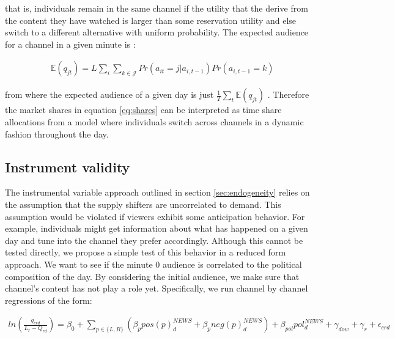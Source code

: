 \documentclass[12pt]{article}
\begin{document}
that is, individuals remain in the same channel if the utility that the derive from the content they have watched is larger than some reservation utility and else switch to a different alternative with uniform probability. The expected audience for a channel in a given minute is :

\begin{equation}\label{}
	\begin{aligned}
		& \mathds{E}(q_{jt})= L \sum_i \sum_{k \in \mathcal{J}}Pr \left(a_{it}= j | a_{i,t-1}\right)Pr \left(a_{i,t-1}=k\right)
	\end{aligned}
\end{equation} 

from where the expected audience of a given day is just $\frac{1}{T}  \sum_t \mathds{E}(q_{jt})$ .  Therefore the market shares in equation \ref{eq:shares} can be interpreted as time share allocations from a model where individuals switch across channels in a dynamic fashion throughout the day. 





\subsection{Instrument validity}


The instrumental variable approach outlined in section \ref{sec:endogeneity} relies on the assumption that the supply shifters are uncorrelated to demand. This assumption would be violated if viewers exhibit some anticipation behavior. For example, individuals might get information about what has happened on a given day and tune into the channel they prefer accordingly. Although this cannot be tested directly, we propose a simple test of this behavior in a reduced form approach. We want to see if the minute 0 audience is correlated to the political composition of the day. By considering the initial audience, we make sure that channel's content has not play a role yet. Specifically, we run channel by channel regressions of the form: 

\begin{equation}\label{eq:check_exogeneity}
	\begin{aligned}
   ln\left( \frac{q_{crd}}{L_{r}-Q_{rd}}  \right) = \beta_0 + \sum_{p \in \{L,R\}}\left(\beta_p pos(p)^{NEWS}_d + \beta_p neg(p)^{NEWS}_d \right)+ \beta_{pol} pol^{NEWS}_d + \gamma_{dow} + \gamma_r + \epsilon_{crd}
	\end{aligned}
\end{equation} 
\end{document}

